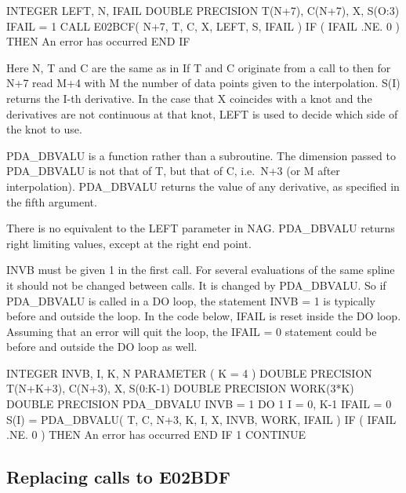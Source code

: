 \documentclass[11pt,twoside,nolof]{starlink}
\begin{document}
\begin{terminalv}
      INTEGER LEFT, N, IFAIL
      DOUBLE PRECISION T(N+7), C(N+7), X, S(O:3)
      IFAIL = 1
      CALL E02BCF( N+7, T, C, X, LEFT, S, IFAIL )
      IF ( IFAIL .NE. 0 ) THEN
         An error has occurred
      END IF
\end{terminalv}

   Here N, T and C are the same as in
   If T and C originate from
   a call to
   then for N+7 read M+4 with M the number of data
   points given to the interpolation. S(I) returns the I-th derivative.
   In the case that X coincides with a knot and the derivatives are not
   continuous at that knot, LEFT is used to decide which side of the
   knot to use.

   PDA\_DBVALU is a function rather than a subroutine. The dimension passed
   to PDA\_DBVALU is not that of T, but that of C, i.e.\ N+3 (or M after
   interpolation). PDA\_DBVALU returns the value of any derivative, as
   specified in the fifth argument.

   There is no equivalent to
   the LEFT parameter in NAG. PDA\_DBVALU returns right limiting values,
   except at the right end point.

   INVB must be given 1 in the first call. For several evaluations of
   the same spline it should not be changed between calls. It is changed
   by PDA\_DBVALU. So if PDA\_DBVALU is called in a DO loop, the statement INVB =
   1 is typically before and outside the loop. In the code below, IFAIL
   is reset inside the DO loop. Assuming that an error will quit the
   loop, the IFAIL = 0 statement could be before and outside the DO loop
   as well.

\begin{terminalv}
      INTEGER INVB, I, K, N
      PARAMETER ( K = 4 )
      DOUBLE PRECISION T(N+K+3), C(N+3), X, S(0:K-1)
      DOUBLE PRECISION WORK(3*K)
      DOUBLE PRECISION PDA_DBVALU
      INVB = 1
      DO 1 I = 0, K-1
         IFAIL = 0
         S(I) = PDA_DBVALU( T, C, N+3, K, I, X, INVB, WORK, IFAIL )
         IF ( IFAIL .NE. 0 ) THEN
            An error has occurred
         END IF
    1 CONTINUE
\end{terminalv}


\subsection{Replacing calls to E02BDF}
\end{document}
